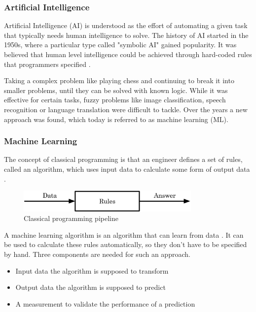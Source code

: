 \subsubsection{Artificial Intelligence}

Artificial Intelligence (AI) is understood as the effort of automating a given task that typically needs human intelligence to solve. The history of AI started in the 1950s, where a particular type called "symbolic AI" gained popularity. It was believed that human level intelligence could be achieved through hard-coded rules that programmers specified \cite{Chollet2017}. 

Taking a complex problem like playing chess and continuing to break it into smaller problems, until they can be solved with known logic. While it was effective for certain tasks, fuzzy problems like image classification, speech recognition or language translation were difficult to tackle. Over the years a new approach was found, which today is referred to as machine learning (ML).

\subsubsection{Machine Learning}

The concept of classical programming is that an engineer defines a set of rules, called an algorithm, which uses input data to calculate some form of output data \cite{Chollet2017}.

\begin{figure}[H]
\centering
\par
\includegraphics[width=0.8\textwidth]{imgs/classic_prog.png}
\caption{Classical programming pipeline}
\par
\end{figure}

A machine learning algorithm is an algorithm that can learn from data \cite{Goodfellow2016}. It can be used to calculate these rules automatically, so they don't have to be specified by hand. Three components are needed for such an approach.

\begin{itemize}
\item Input data the algorithm is supposed to transform
\item Output data the algorithm is supposed to predict
\item A measurement to validate the performance of a prediction
\end{itemize}

